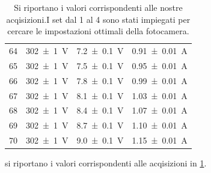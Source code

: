\begin{table}[hb]
\begin{tabular}{|c|c|c|c|}
			64 & \SI{302 \pm 1}{\volt} &\SI{7.2 \pm 0.1}{\volt} & \SI{0.91 \pm 0.01}{\ampere}\\
			65 & \SI{302 \pm 1}{\volt} &\SI{7.5 \pm 0.1}{\volt} & \SI{0.95 \pm 0.01}{\ampere}\\
			66 & \SI{302 \pm 1}{\volt} &\SI{7.8 \pm 0.1}{\volt} & \SI{0.99 \pm 0.01}{\ampere}\\
			67 & \SI{302 \pm 1}{\volt} &\SI{8.1 \pm 0.1}{\volt} & \SI{1.03 \pm 0.01}{\ampere}\\
			68 & \SI{302 \pm 1}{\volt} &\SI{8.4 \pm 0.1}{\volt} & \SI{1.07 \pm 0.01}{\ampere}\\
			69 & \SI{302 \pm 1}{\volt} &\SI{8.7 \pm 0.1}{\volt} & \SI{1.10 \pm 0.01}{\ampere}\\
			70 & \SI{302 \pm 1}{\volt} &\SI{9.0 \pm 0.1}{\volt} & \SI{1.15 \pm 0.01}{\ampere}\\
			\bottomrule
		\end{tabular}
		\caption{Si riportano i valori corrispondenti alle nostre acqisizioni.I set dal 1 al 4 sono stati impiegati per cercare le impostazioni ottimali della fotocamera.}
		\label{t:b}
	\end{table}
	 si riportano i valori corrispondenti alle acqisizioni in \tablename{ \ref{t:b}}.

	
	
	
	
